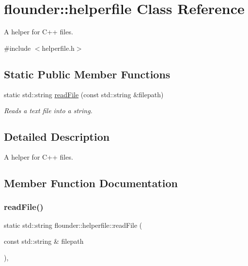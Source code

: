 \hypertarget{classflounder_1_1helperfile}{}\section{flounder\+:\+:helperfile Class Reference}
\label{classflounder_1_1helperfile}


A helper for C++ files.  




{\ttfamily \#include $<$helperfile.\+h$>$}

\subsection*{Static Public Member Functions}
\begin{DoxyCompactItemize}
\item 
static std\+::string \hyperlink{classflounder_1_1helperfile_a3e0cf9aeb402172757a2ee2bf22a4c7f}{read\+File} (const std\+::string \&filepath)
\begin{DoxyCompactList}\small\item\em Reads a text file into a string. \end{DoxyCompactList}\end{DoxyCompactItemize}


\subsection{Detailed Description}
A helper for C++ files. 



\subsection{Member Function Documentation}
\mbox{\label{classflounder_1_1helperfile_a3e0cf9aeb402172757a2ee2bf22a4c7f}} 
\subsubsection{\texorpdfstring{read\+File()}{readFile()}}
{\footnotesize\ttfamily static std\+::string flounder\+::helperfile\+::read\+File (\begin{DoxyParamCaption}\item[{const std\+::string \&}]{filepath }\end{DoxyParamCaption})\hspace{0.3cm}{\ttfamily [inline]}, {\ttfamily [static]}}



